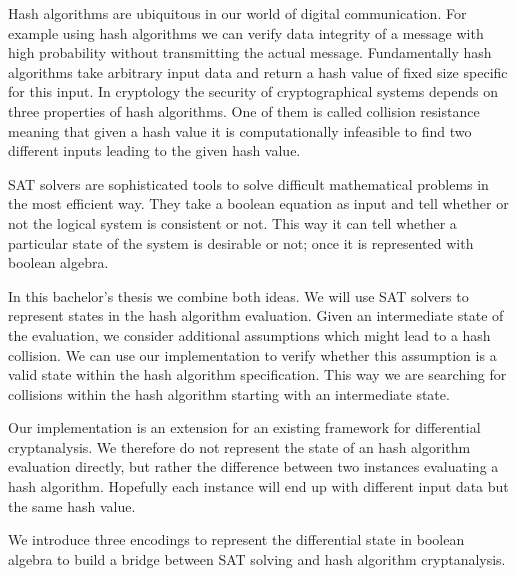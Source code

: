 Hash algorithms are ubiquitous in our world of digital communication.
For example using hash algorithms we can verify data integrity of a message
with high probability without transmitting the actual message. Fundamentally
hash algorithms take arbitrary input data and return a hash value of fixed
size specific for this input. In cryptology the security of cryptographical
systems depends on three properties of hash algorithms. One of them is called
collision resistance meaning that given a hash value it is computationally
infeasible to find two different inputs leading to the given hash value.

SAT solvers are sophisticated tools to solve difficult mathematical problems
in the most efficient way. They take a boolean equation as input and tell
whether or not the logical system is consistent or not. This way it can tell
whether a particular state of the system is desirable or not; once it is
represented with boolean algebra.

In this bachelor's thesis we combine both ideas. We will use SAT solvers to
represent states in the hash algorithm evaluation. Given an intermediate
state of the evaluation, we consider additional assumptions which might
lead to a hash collision. We can use our implementation to verify whether
this assumption is a valid state within the hash algorithm specification.
This way we are searching for collisions within the hash algorithm starting
with an intermediate state.

Our implementation is an extension for an existing framework for differential
cryptanalysis. We therefore do not represent the state of an hash algorithm
evaluation directly, but rather the difference between two instances evaluating
a hash algorithm. Hopefully each instance will end up with different input data
but the same hash value.

We introduce three encodings to represent the differential state in boolean
algebra to build a bridge between SAT solving and hash algorithm cryptanalysis.
